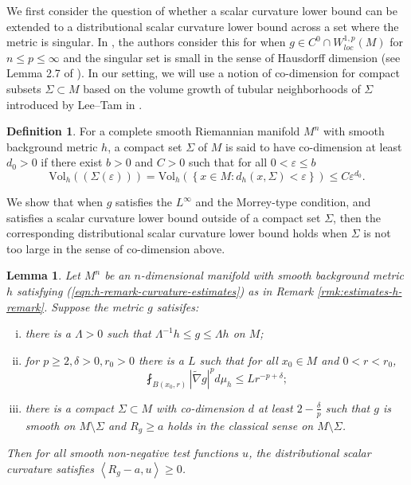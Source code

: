 \documentclass[12pt]{amsart}
\theoremstyle{plain}
\theoremstyle{plain}
\newtheorem{lemma}[subsection]{Lemma}
\theoremstyle{definition}
\newtheorem{definition}[subsection]{Definition}
\theoremstyle{remark}
\numberwithin{equation}{subsection}
\newcommand{\hdel}{\tilde{\nabla}}
\begin{document}
We first consider the question of whether a scalar curvature lower bound can be extended to a distributional scalar curvature lower bound across a set where the metric is singular. In \cite{jiang_removable_2022}, the authors consider this for when $g \in C^0 \cap W^{1,p}_{loc}(M)$ for $n \leq p \leq \infty$ and the singular set is small in the sense of Hausdorff dimension (see Lemma 2.7 of \cite{jiang_removable_2022}). In our setting, we will use a notion of co-dimension for compact subsets $\Sigma \subset M$ based on the volume growth of tubular neighborhoods of $\Sigma$ introduced by Lee--Tam in \cite{lee_continuous_2021}.

\begin{definition}
For a complete smooth Riemannian manifold $M^n$ with smooth background metric $h$, a compact set $\Sigma$ of $M$ is said to have co-dimension at least $d_0 > 0$ if there exist $b > 0$ and $C > 0$ such that for all $0 < \varepsilon \leq b$
\begin{equation*}
    \text{Vol}_h(\left(\Sigma(\varepsilon)\right)) = \text{Vol}_h\left(\left\{x \in M : d_h(x,\Sigma) < \varepsilon\right\}\right) \leq C\varepsilon^{d_0}.
\end{equation*}
\end{definition}

We show that when $g$ satisfies the $L^\infty$ and the Morrey-type condition, and satisfies a scalar curvature lower bound outside of a compact set $\Sigma$, then the corresponding distributional scalar curvature lower bound holds when $\Sigma$ is not too large in the sense of co-dimension above.

\begin{lemma}\label{lem:distributional-scalar-curvature}
    Let $M^n$ be an $n$-dimensional manifold with smooth background metric $h$ satisfying (\ref{eqn:h-remark-curvature-estimates}) as in Remark \ref{rmk:estimates-h-remark}. Suppose the metric $g$ satisifes:
    \begin{enumerate}[(i)]
        \item there is a $\Lambda > 0$ such that $\Lambda^{-1}h \leq g \leq \Lambda h$ on $M$;
        \item for $p \geq 2, \delta > 0, r_0 > 0$ there is a $L$ such that for all $x_0 \in M$ and $0 < r < r_0$,
        \begin{equation*}
            \fint_{B(x_0, r)} |\hdel g|^p d\mu_h \leq L r^{-p + \delta};
        \end{equation*}
        \item there is a compact $\Sigma \subset M$ with co-dimension $d$ at least $2 - \frac{\delta}{p}$ such that $g$ is smooth on $M \setminus \Sigma$ and $R_g \geq a$ holds in the classical sense on $M \setminus \Sigma$.
    \end{enumerate}
    Then for all smooth non-negative test functions $u$, the distributional scalar curvature satisfies $\left\langle R_g - a, u \right\rangle \geq 0$.
\end{lemma}
\end{document}
